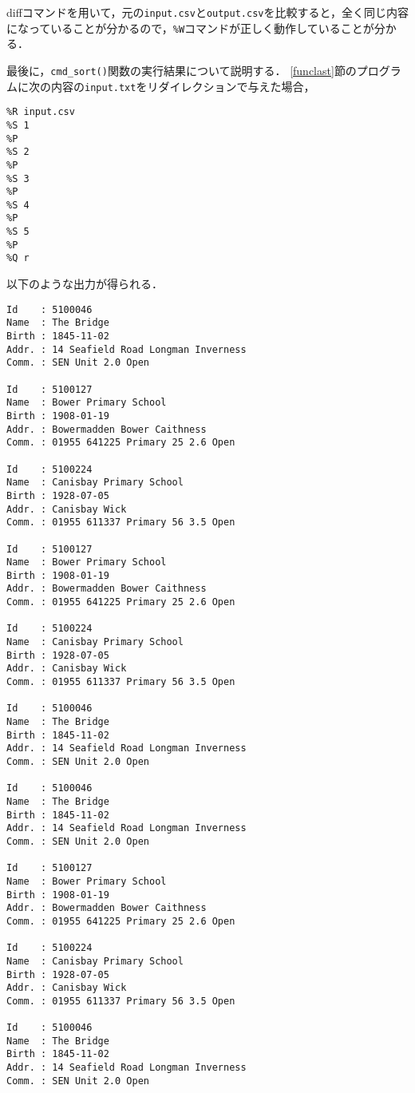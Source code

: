 diffコマンドを用いて，元の\verb|input.csv|と\verb|output.csv|を比較すると，全く同じ内容になっていることが分かるので，\verb|%W|コマンドが正しく動作していることが分かる．

最後に，\verb|cmd_sort()|関数の実行結果について説明する．
\ref{funclast}節のプログラムに次の内容の\verb|input.txt|をリダイレクションで与えた場合，

{\fontsize{10pt}{11pt} \selectfont
 \begin{verbatim}
%R input.csv
%S 1
%P
%S 2
%P
%S 3
%P
%S 4
%P
%S 5
%P
%Q r
 \end{verbatim}
}

\noindent %
以下のような出力が得られる．

{\fontsize{10pt}{11pt} \selectfont
 \begin{verbatim}
Id    : 5100046
Name  : The Bridge
Birth : 1845-11-02
Addr. : 14 Seafield Road Longman Inverness
Comm. : SEN Unit 2.0 Open

Id    : 5100127
Name  : Bower Primary School
Birth : 1908-01-19
Addr. : Bowermadden Bower Caithness
Comm. : 01955 641225 Primary 25 2.6 Open

Id    : 5100224
Name  : Canisbay Primary School
Birth : 1928-07-05
Addr. : Canisbay Wick
Comm. : 01955 611337 Primary 56 3.5 Open

Id    : 5100127
Name  : Bower Primary School
Birth : 1908-01-19
Addr. : Bowermadden Bower Caithness
Comm. : 01955 641225 Primary 25 2.6 Open

Id    : 5100224
Name  : Canisbay Primary School
Birth : 1928-07-05
Addr. : Canisbay Wick
Comm. : 01955 611337 Primary 56 3.5 Open

Id    : 5100046
Name  : The Bridge
Birth : 1845-11-02
Addr. : 14 Seafield Road Longman Inverness
Comm. : SEN Unit 2.0 Open

Id    : 5100046
Name  : The Bridge
Birth : 1845-11-02
Addr. : 14 Seafield Road Longman Inverness
Comm. : SEN Unit 2.0 Open

Id    : 5100127
Name  : Bower Primary School
Birth : 1908-01-19
Addr. : Bowermadden Bower Caithness
Comm. : 01955 641225 Primary 25 2.6 Open

Id    : 5100224
Name  : Canisbay Primary School
Birth : 1928-07-05
Addr. : Canisbay Wick
Comm. : 01955 611337 Primary 56 3.5 Open

Id    : 5100046
Name  : The Bridge
Birth : 1845-11-02
Addr. : 14 Seafield Road Longman Inverness
Comm. : SEN Unit 2.0 Open


\end{verbatim}}
